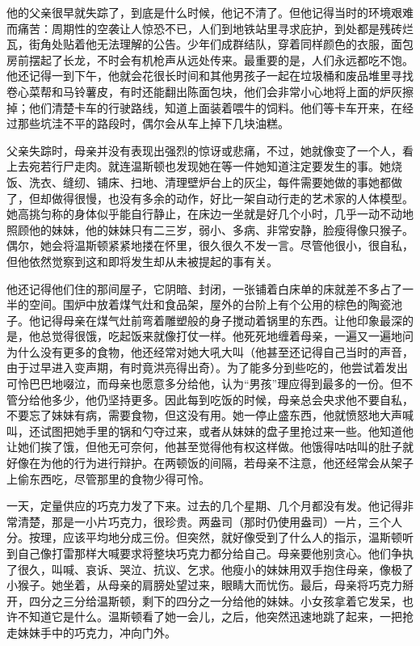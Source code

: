 他的父亲很早就失踪了，到底是什么时候，他记不清了。但他记得当时的环境艰难而痛苦：周期性的空袭让人惊恐不已，人们到地铁站里寻求庇护，到处都是残砖烂瓦，街角处贴着他无法理解的公告。少年们成群结队，穿着同样颜色的衣服，面包房前摆起了长龙，不时会有机枪声从远处传来。最重要的是，人们永远都吃不饱。他还记得一到下午，他就会花很长时间和其他男孩子一起在垃圾桶和废品堆里寻找卷心菜帮和马铃薯皮，有时还能翻出陈面包块，他们会非常小心地将上面的炉灰擦掉；他们清楚卡车的行驶路线，知道上面装着喂牛的饲料。他们等卡车开来，在经过那些坑洼不平的路段时，偶尔会从车上掉下几块油糕。

父亲失踪时，母亲并没有表现出强烈的惊讶或悲痛，不过，她就像变了一个人，看上去宛若行尸走肉。就连温斯顿也发现她在等一件她知道注定要发生的事。她烧饭、洗衣、缝纫、铺床、扫地、清理壁炉台上的灰尘，每件需要她做的事她都做了，但却做得很慢，也没有多余的动作，好比一架自动行走的艺术家的人体模型。她高挑匀称的身体似乎能自行静止，在床边一坐就是好几个小时，几乎一动不动地照顾他的妹妹，他的妹妹只有二三岁，弱小、多病、非常安静，脸瘦得像只猴子。偶尔，她会将温斯顿紧紧地搂在怀里，很久很久不发一言。尽管他很小，很自私，但他依然觉察到这和即将发生却从未被提起的事有关。

他还记得他们住的那间屋子，它阴暗、封闭，一张铺着白床单的床就差不多占了一半的空间。围炉中放着煤气灶和食品架，屋外的台阶上有个公用的棕色的陶瓷池子。他记得母亲在煤气灶前弯着雕塑般的身子搅动着锅里的东西。让他印象最深的是，他总觉得很饿，吃起饭来就像打仗一样。他死死地缠着母亲，一遍又一遍地问为什么没有更多的食物，他还经常对她大吼大叫（他甚至还记得自己当时的声音，由于过早进入变声期，有时竟洪亮得出奇）。为了能多分到些吃的，他尝试着发出可怜巴巴地啜泣，而母亲也愿意多分给他，认为``男孩''理应得到最多的一份。但不管分给他多少，他仍坚持更多。因此每到吃饭的时候，母亲总会央求他不要自私，不要忘了妹妹有病，需要食物，但这没有用。她一停止盛东西，他就愤怒地大声喊叫，还试图把她手里的锅和勺夺过来，或者从妹妹的盘子里抢过来一些。他知道他让她们挨了饿，但他无可奈何，他甚至觉得他有权这样做。他饿得咕咕叫的肚子就好像在为他的行为进行辩护。在两顿饭的间隔，若母亲不注意，他还经常会从架子上偷东西吃，尽管那里的食物少得可怜。

一天，定量供应的巧克力发了下来。过去的几个星期、几个月都没有发。他记得非常清楚，那是一小片巧克力，很珍贵。两盎司（那时仍使用盎司）一片，三个人分。按理，应该平均地分成三份。但突然，就好像受到了什么人的指示，温斯顿听到自己像打雷那样大喊要求将整块巧克力都分给自己。母亲要他别贪心。他们争执了很久，叫喊、哀诉、哭泣、抗议、乞求。他瘦小的妹妹用双手抱住母亲，像极了小猴子。她坐着，从母亲的肩膀处望过来，眼睛大而忧伤。最后，母亲将巧克力掰开，四分之三分给温斯顿，剩下的四分之一分给他的妹妹。小女孩拿着它发呆，也许不知道它是什么。温斯顿看了她一会儿，之后，他突然迅速地跳了起来，一把抢走妹妹手中的巧克力，冲向门外。

